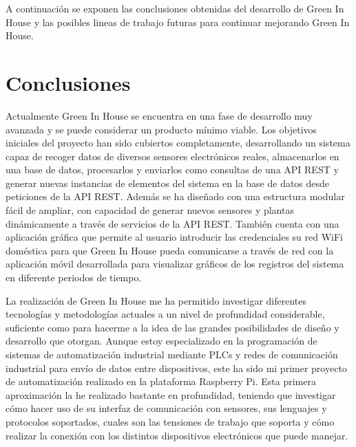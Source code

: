 
A continuación se exponen las conclusiones obtenidas del desarrollo de Green In House y las posibles lineas de trabajo futuras para continuar mejorando Green In House.

\section{Conclusiones}
Actualmente Green In House se encuentra en una fase de desarrollo muy avanzada y se puede considerar un producto mínimo viable. Los objetivos iniciales del proyecto han sido cubiertos completamente, desarrollando un sistema capaz de recoger datos de diversos sensores electrónicos reales, almacenarlos en una base de datos, procesarlos y enviarlos como consultas de una API REST y generar nuevas instancias de elementos del sistema en la base de datos desde peticiones de la API REST. Además se ha diseñado con una estructura modular fácil de ampliar, con capacidad de generar nuevos sensores y plantas dinámicamente a través de servicios de la API REST. También cuenta con una aplicación gráfica que permite al usuario introducir las credenciales su red WiFi doméstica para que Green In House pueda comunicarse a través de red con la aplicación móvil desarrollada para visualizar gráficos de los registros del sistema en diferente periodos de tiempo.

La realización de Green In House me ha permitido investigar diferentes tecnologías y metodologías actuales a un nivel de profundidad considerable, suficiente como para hacerme a la idea de las grandes posibilidades de diseño y desarrollo que otorgan. 
Aunque estoy especializado en la programación de sistemas de automatización industrial mediante PLCs y redes de comunicación industrial para envío de datos entre dispositivos, este ha sido mi primer proyecto de automatización realizado  en la plataforma Raspberry Pi. Esta primera aproximación la he realizado bastante en profundidad, teniendo que investigar cómo hacer uso de su interfaz de comunicación con sensores, sus lenguajes y protocolos soportados, cuales son las tensiones de trabajo que soporta y cómo realizar la conexión con los distintos dispositivos electrónicos que puede manejar.

